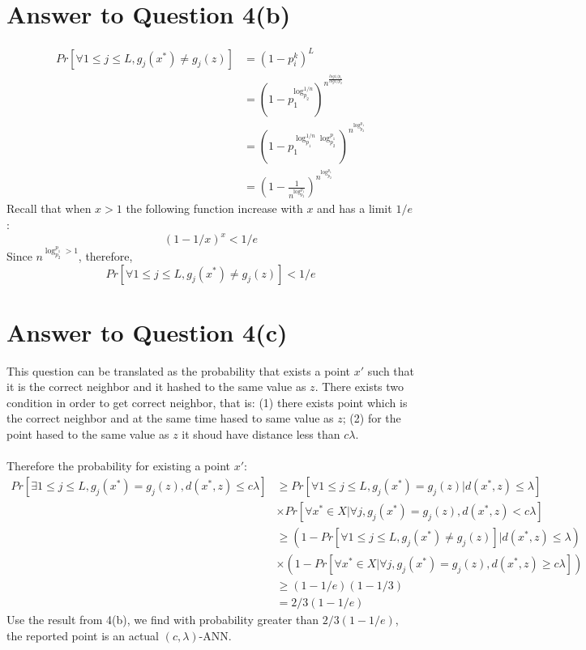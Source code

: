 \documentclass[11pt]{article}
\begin{document}
\pagebreak[4]
\section*{Answer to Question 4(b)}
\begin{equation}
\begin{aligned}
Pr[\forall1\leq j\leq L, g_j(x^{*})\neq g_j(z)] & = (1-p_i^k)^L\\
& = (1-p_1^{\log_{p_2}^{1/n}})^{n^{\frac{log{1/p_1}}{log{1/p_2}}}}\\
& = (1-p_1^{\log_{p_1}^{1/n}\log_{p_2}^{p_1}})^{n^{\log_{p_2}^{p_1}}}\\
& = (1-{\frac{1}{n^{\log_{p_2}^{p_1}}}})^{n^{\log_{p_2}^{p_1}}}
\end{aligned}
\end{equation}
Recall that when $x>1$ the following function increase with $x$ and has a limit $1/e$:
\begin{equation}
(1 - 1/x)^x < 1/e
\end{equation}
Since $n^{\log_{p_2}^{p_1} > 1}$, therefore,
\begin{equation}
Pr[\forall1\leq j\leq L, g_j(x^{*})\neq g_j(z)] < 1/e
\end{equation}

\pagebreak[4]
\section*{Answer to Question 4(c)}
This question can be translated as the probability that exists a point $x'$ such that it is the correct neighbor and it hashed to the same value as $z$.
There exists two condition in order to get correct neighbor, that is: (1)
there exists point which is the correct neighbor and at the same time hased to same value as $z$;
(2) for the point hased to the same value as $z$ it shoud have distance less than $c\lambda$.\\
\\
Therefore the probability for existing a point $x'$:
\begin{equation*}
\begin{aligned}
    Pr[\exists1\leq j\leq L, g_j(x^{*}) = g_j(z),d(x^{*}, z)\leq c\lambda]
    & \geq Pr[\forall1\leq j\leq L, g_j(x^{*}) = g_j(z)|d(x^{*}, z)\leq \lambda]\\
    & \times Pr[\forall x^{*}\in X | \forall j, g_j(x^{*}) = g_j(z), d(x^{*}, z) < c\lambda]\\
    & \geq (1 - Pr[\forall1\leq j\leq L, g_j(x^{*})\neq g_j(z)]|d(x^{*}, z)\leq \lambda)\\
    & \times (1 - Pr[\forall x^{*}\in X | \forall j, g_j(x^{*}) = g_j(z), d(x^{*}, z)\geq c\lambda])\\
    & \geq (1 - 1/e)(1 - 1/3)\\
    & = 2/3(1 - 1/e)
\end{aligned}
\end{equation*}
Use the result from 4(b), we find with probability greater than $2/3(1 - 1/e)$,
the reported point is an actual $(c, \lambda)$-ANN.
\end{document}
